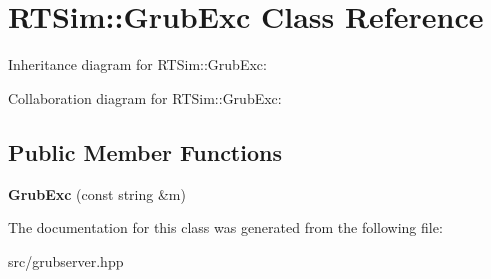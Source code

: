 \hypertarget{classRTSim_1_1GrubExc}{}\section{R\+T\+Sim\+:\+:Grub\+Exc Class Reference}
\label{classRTSim_1_1GrubExc}


Inheritance diagram for R\+T\+Sim\+:\+:Grub\+Exc\+:


Collaboration diagram for R\+T\+Sim\+:\+:Grub\+Exc\+:
\subsection*{Public Member Functions}
\begin{DoxyCompactItemize}
\item 
{\bfseries Grub\+Exc} (const string \&m)\hypertarget{classRTSim_1_1GrubExc_a6adb7984fd4fba6d6ecc6d4dca2a9324}{}\label{classRTSim_1_1GrubExc_a6adb7984fd4fba6d6ecc6d4dca2a9324}

\end{DoxyCompactItemize}


The documentation for this class was generated from the following file\+:\begin{DoxyCompactItemize}
\item 
src/grubserver.\+hpp\end{DoxyCompactItemize}
